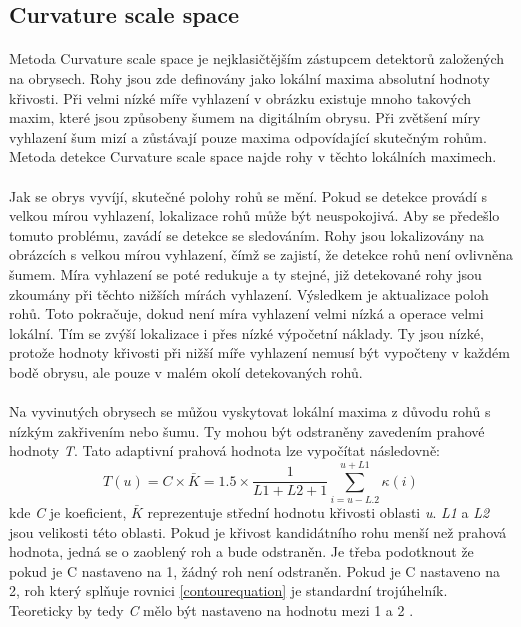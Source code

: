 \subsection*{Curvature scale space} 
\label{curv}
\paragraph{}Metoda Curvature scale space \cite{css} je nejklasičtějším zástupcem detektorů založených na obrysech. Rohy jsou zde definovány jako lokální maxima absolutní hodnoty křivosti. Při velmi nízké míře vyhlazení v obrázku existuje mnoho takových maxim, které jsou způsobeny šumem na digitálním obrysu. Při zvětšení míry vyhlazení šum mizí a zůstávají pouze maxima odpovídající skutečným rohům. Metoda detekce Curvature scale space najde rohy v těchto lokálních maximech.
\paragraph{} Jak se obrys vyvíjí, skutečné polohy rohů se mění. Pokud se detekce provádí s velkou mírou vyhlazení, lokalizace rohů může být neuspokojivá. Aby se předešlo tomuto problému, zavádí se detekce se sledováním. Rohy jsou lokalizovány na obrázcích s velkou mírou vyhlazení, čímž se zajistí, že detekce rohů není ovlivněna šumem. Míra vyhlazení se poté redukuje a ty stejné, již detekované rohy jsou zkoumány při těchto nižších mírách vyhlazení. Výsledkem je aktualizace poloh rohů. Toto pokračuje, dokud není míra vyhlazení velmi nízká a operace velmi lokální. Tím se zvýší lokalizace i přes nízké výpočetní náklady. Ty jsou nízké, protože hodnoty křivosti při nižší míře vyhlazení nemusí být vypočteny v každém bodě obrysu, ale pouze v malém okolí detekovaných rohů.
\paragraph{} Na vyvinutých obrysech se můžou vyskytovat lokální maxima z důvodu rohů s nízkým zakřivením nebo šumu. Ty mohou být odstraněny zavedením prahové hodnoty \textit{T}. Tato adaptivní prahová hodnota lze vypočítat následovně:
\begin{equation}\label{contourequation}
T(u)=C \times \bar{K}=1.5 \times \frac{1}{L 1+L 2+1} \sum_{i=u-L .2}^{u+L 1} \kappa(i)
\end{equation}
kde \textit{C} je koeficient, \begin{math}\bar{K}\end{math} reprezentuje střední hodnotu křivosti oblasti \textit{u}. \textit{L1} a \textit{L2} jsou velikosti této oblasti. Pokud je křivost kandidátního rohu menší než prahová hodnota, jedná se o zaoblený roh a bude odstraněn. Je třeba podotknout že pokud je C nastaveno na 1, žádný roh není odstraněn. Pokud je C nastaveno na 2, roh který splňuje rovnici \ref{contourequation} je standardní trojúhelník. Teoreticky by tedy \textit{C} mělo být nastaveno na hodnotu mezi 1 a 2 \cite{cssequation}.
\pagebreak

